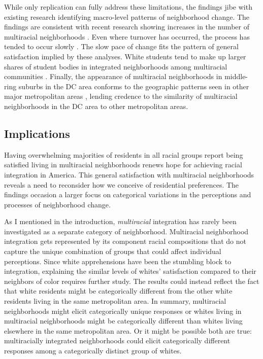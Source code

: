 \documentclass{baderart}
\begin{document}
While only replication can fully address these limitations, the findings jibe with existing research identifying macro-level patterns of neighborhood change. The findings are consistent with recent research showing increases in the number of multiracial neighborhoods \citep{friedman_declines_2008, logan_global_2010, bader_fragmented_2016}. Even where turnover has occurred, the process has tended to occur slowly \citep{ellen_sharing_2000, bader_fragmented_2016}. The slow pace of change fits the pattern of general satisfaction implied by these analyses. White students tend to make up larger shares of student bodies in integrated neighborhoods among multiracial communities \citep{rastogi_impacts_2019}. Finally, the appearance of multiracial neighborhoods in middle-ring suburbs in the DC area conforms to the geographic patterns seen in other major metropolitan areas \citep[e.g., ][]{bader_fragmented_2016}, lending credence to the similarity of multiracial neighborhoods in the DC area to other metropolitan areas. 

\subsection{Implications}
Having overwhelming majorities of residents in all racial groups report being satisfied living in multiracial neighborhoods renews hope for achieving racial integration in America. This general satisfaction with multiracial neighborhoods reveals a need to reconsider how we conceive of residential preferences. The findings occasion a larger focus on categorical variations in the perceptions and processes of neighborhood change.

 As I mentioned in the introduction, \emph{multiracial} integration has rarely been investigated as a separate category of neighborhood. Multiracial neighborhood integration gets represented by its component racial compositions that do not capture the unique combination of groups that could affect individual perceptions.  Since white apprehensions have been the stumbling block to integration, explaining the similar levels of whites' satisfaction compared to their neighbors of color requires further study.  The results could instead reflect the fact that white residents might be categorically different from the other white residents living in the same metropolitan area. In summary, multiracial neighborhoods might elicit categorically unique responses or whites living in multiracial neighborhoods might be categorically different than whites living elsewhere in the same metropolitan area. Or it might be possible both are true: multiracially integrated neighborhoods could elicit categorically different responses among a categorically distinct group of whites. 
\end{document}
